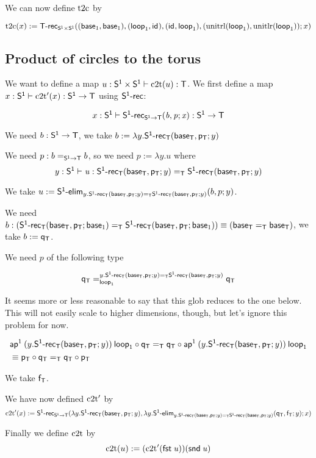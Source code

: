 We can now define $\ttoc$ by

\[\ttoc(x):=\dsd{T\text{-}rec}_{\PP}((\base{1},\base{1}),(\lp{1},\id{})
,(\id{},\lp{1}),(\unitrl(\lp{1}),\unitlr(\lp{1}));x)\]

\subsection{Product of circles to the torus}

We want to define a map $u:\PP\vdash\ctot(u):\dsd{T}$. We first define a map
$x:\dsd{S^1}\vdash\ctot'(x):\dsd{S^1}\to\dsd{T}$ using $\dsd{S^1\text{-}rec}$:

\[\ofglob{x:\dsd{S^1}}{\dsd{S^1\text{-}rec}_{\dsd{S^1}\to\dsd{T}}(b,p;x)}
{\dsd{S^1}\to\dsd{T}}\]

We need $b:\dsd{S^1}\to\dsd{T}$, we take
$b:=\lambda{}y.\dsd{S^1\text{-}rec}_{\dsd{T}}(\baseT,\pT;y)$

We need $p:\homj{\dsd{S^1}\to\dsd{T}}{b}{b}$, so we need $p:=\lambda y.u$ where
\[\ofglob{y:\dsd{S^1}}{u}{\homj{\dsd{T}}
  {\dsd{S^1\text{-}rec}_{\dsd{T}}(\baseT,\pT;y)}
  {\dsd{S^1\text{-}rec}_{\dsd{T}}(\baseT,\pT;y)}}\]

We take $u:=\dsd{S^1\text{-}elim}_{y.\homj{\dsd{T}}
  {\dsd{S^1\text{-}rec}_{\dsd{T}}(\baseT,\pT;y)}
  {\dsd{S^1\text{-}rec}_{\dsd{T}}(\baseT,\pT;y)}}(b,p;y)$.

We need $b:(\homj{\dsd{T}}
{\dsd{S^1\text{-}rec}_{\dsd{T}}(\baseT,\pT;\base{1})}
{\dsd{S^1\text{-}rec}_{\dsd{T}}(\baseT,\pT;\base{1})})
\equiv(\homj{\dsd{T}}{\baseT}{\baseT})$, we take $b:=\qT$.

We need $p$ of the following type

\[\dhomj{y.\homj{\dsd{T}}
  {\dsd{S^1\text{-}rec}_{\dsd{T}}(\baseT,\pT;y)}
  {\dsd{S^1\text{-}rec}_{\dsd{T}}(\baseT,\pT;y)}}{\qT}{\qT}{\lp{1}}\]

It seems more or less reasonable to say that this glob reduces to the one
below. This will not easily scale to higher dimensions, though, but let’s
ignore this problem for now.

\begin{align*}
  &\homj{\dsd{T}}{\apn{1}{(y.\dsd{S^1\text{-}rec}_{\dsd{T}}(\baseT,\pT;y))}
    {\lp{1}}\circ\qT}
  {\qT\circ\apn{1}{(y.\dsd{S^1\text{-}rec}_{\dsd{T}}(\baseT,\pT;y))} {\lp{1}}}
  \\
  &\equiv \homj{\dsd{T}}{\pT\circ\qT}{\qT\circ\pT}
\end{align*}

We take $\fT$.

We have now defined $\ctot'$ by
\[\ctot'(x):=\dsd{S^1\text{-}rec}_{\dsd{S^1}\to\dsd{T}}
(\lambda{}y.\dsd{S^1\text{-}rec}_{\dsd{T}}(\baseT,\pT;y),
\lambda{}y.\dsd{S^1\text{-}elim}_{y.\homj{\dsd{T}}
  {\dsd{S^1\text{-}rec}_{\dsd{T}}(\baseT,\pT;y)}
  {\dsd{S^1\text{-}rec}_{\dsd{T}}(\baseT,\pT;y)}}(\qT,\fT;y);x)\]

Finally we define $\ctot$ by
\[\ctot(u):=(\ctot'(\fst u))(\snd u)\]

